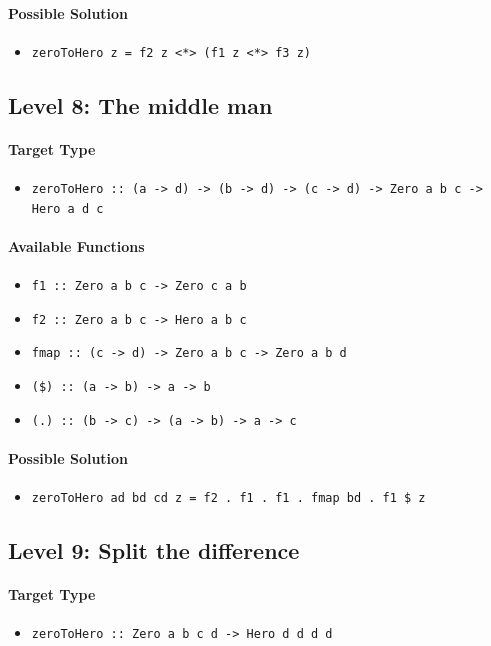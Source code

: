 \documentclass[preprint,12pt]{elsarticle}
\begin{document}
\paragraph{Possible Solution} 
\begin{itemize}
    \item \texttt{zeroToHero z = f2 z <*> (f1 z <*> f3 z)}
\end{itemize}

\subsection{Level 8: The middle man}
\paragraph{Target Type } 
\begin{itemize}
    \item \texttt{zeroToHero :: (a -> d) -> (b -> d) -> (c -> d) -> Zero a b c ->  Hero a d c}
\end{itemize}

\paragraph{Available Functions} 
\begin{itemize}
    \item \texttt{f1 :: Zero a b c -> Zero c a b}
    \item \texttt{f2 :: Zero a b c -> Hero a b c}
    \item \texttt{fmap :: (c -> d) -> Zero a b c -> Zero a b d}
    \item \texttt{(\$) :: (a -> b) -> a -> b}
    \item \texttt{(.) :: (b -> c) -> (a -> b) -> a -> c}
\end{itemize}

\paragraph{Possible Solution} 
\begin{itemize}
    \item \texttt{zeroToHero ad bd cd z = f2  . f1  . f1  . fmap bd  . f1 \$ z}
\end{itemize}

\subsection{Level 9: Split the difference}
\paragraph{Target Type } 
\begin{itemize}
    \item \texttt{zeroToHero :: Zero a b c d ->  Hero d d d d}
\end{itemize}
\end{document}
